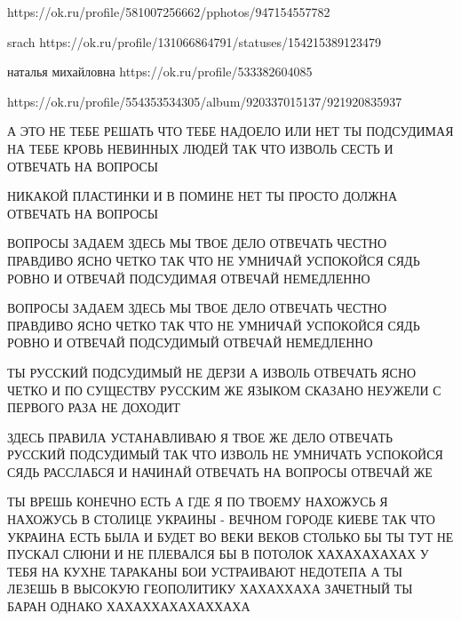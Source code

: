  
 
 
 
 




https://ok.ru/profile/581007256662/pphotos/947154557782

srach
https://ok.ru/profile/131066864791/statuses/154215389123479

наталья михайловна
https://ok.ru/profile/533382604085

https://ok.ru/profile/554353534305/album/920337015137/921920835937

А ЭТО НЕ ТЕБЕ РЕШАТЬ ЧТО ТЕБЕ НАДОЕЛО ИЛИ НЕТ ТЫ ПОДСУДИМАЯ НА ТЕБЕ КРОВЬ
НЕВИННЫХ ЛЮДЕЙ ТАК ЧТО ИЗВОЛЬ СЕСТЬ И ОТВЕЧАТЬ НА ВОПРОСЫ

НИКАКОЙ ПЛАСТИНКИ И В ПОМИНЕ НЕТ ТЫ ПРОСТО ДОЛЖНА ОТВЕЧАТЬ НА ВОПРОСЫ

ВОПРОСЫ ЗАДАЕМ ЗДЕСЬ МЫ ТВОЕ ДЕЛО ОТВЕЧАТЬ ЧЕСТНО ПРАВДИВО ЯСНО ЧЕТКО ТАК ЧТО
НЕ УМНИЧАЙ УСПОКОЙСЯ СЯДЬ РОВНО И ОТВЕЧАЙ ПОДСУДИМАЯ ОТВЕЧАЙ НЕМЕДЛЕННО

ВОПРОСЫ ЗАДАЕМ ЗДЕСЬ МЫ ТВОЕ ДЕЛО ОТВЕЧАТЬ ЧЕСТНО ПРАВДИВО ЯСНО ЧЕТКО ТАК ЧТО
НЕ УМНИЧАЙ УСПОКОЙСЯ СЯДЬ РОВНО И ОТВЕЧАЙ ПОДСУДИМЫЙ ОТВЕЧАЙ НЕМЕДЛЕННО

ТЫ РУССКИЙ ПОДСУДИМЫЙ НЕ ДЕРЗИ А ИЗВОЛЬ ОТВЕЧАТЬ ЯСНО ЧЕТКО И ПО СУЩЕСТВУ
РУССКИМ ЖЕ ЯЗЫКОМ СКАЗАНО НЕУЖЕЛИ С ПЕРВОГО РАЗА НЕ ДОХОДИТ

ЗДЕСЬ ПРАВИЛА УСТАНАВЛИВАЮ Я ТВОЕ ЖЕ ДЕЛО ОТВЕЧАТЬ РУССКИЙ ПОДСУДИМЫЙ ТАК ЧТО
ИЗВОЛЬ НЕ УМНИЧАТЬ УСПОКОЙСЯ СЯДЬ РАССЛАБСЯ И НАЧИНАЙ ОТВЕЧАТЬ НА ВОПРОСЫ
ОТВЕЧАЙ ЖЕ

ТЫ ВРЕШЬ КОНЕЧНО ЕСТЬ А ГДЕ Я ПО ТВОЕМУ НАХОЖУСЬ Я НАХОЖУСЬ В СТОЛИЦЕ УКРАИНЫ -
ВЕЧНОМ ГОРОДЕ КИЕВЕ ТАК ЧТО УКРАИНА ЕСТЬ БЫЛА И БУДЕТ ВО ВЕКИ ВЕКОВ СТОЛЬКО БЫ
ТЫ ТУТ НЕ ПУСКАЛ СЛЮНИ И НЕ ПЛЕВАЛСЯ БЫ В ПОТОЛОК ХАХАХАХАХАХ У ТЕБЯ НА КУХНЕ
ТАРАКАНЫ БОИ УСТРАИВАЮТ НЕДОТЕПА А ТЫ ЛЕЗЕШЬ В ВЫСОКУЮ ГЕОПОЛИТИКУ ХАХАХХАХА
ЗАЧЕТНЫЙ ТЫ БАРАН ОДНАКО ХАХАХХАХАХАХХАХА

